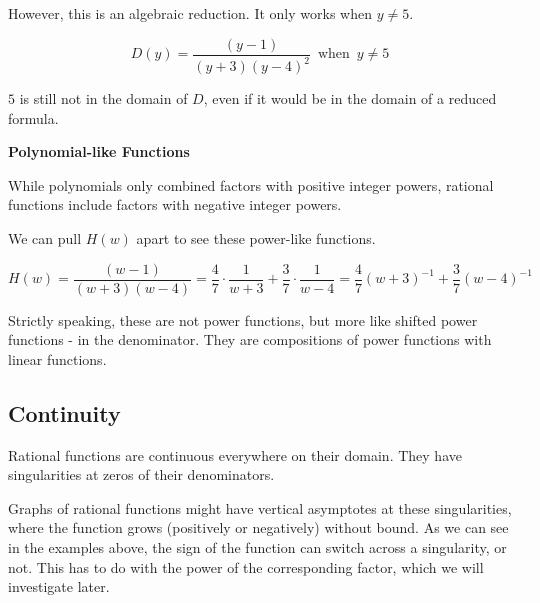 \documentclass{ximera}
\begin{document}
However, this is an algebraic reduction. It only works when $y \ne 5$.


\[
D(y) = \frac{(y-1)}{(y+3) (y-4)^2} \, \text{ when } \, y \ne 5
\]


$5$ is still not in the domain of $D$, even if it would be in the domain of a reduced formula.






\textbf{Polynomial-like Functions}


While polynomials only combined factors with positive integer powers, rational functions include factors with negative integer powers.


We can pull $H(w)$ apart to see these power-like functions.


\[    H(w) = \frac{(w-1)}{(w+3) (w-4)}  = \frac{4}{7} \cdot \frac{1}{w+3}  + \frac{3}{7} \cdot \frac{1}{w-4} =  \frac{4}{7} (w+3)^{-1}  + \frac{3}{7} (w-4)^{-1} \]


Strictly speaking, these are not power functions, but more like shifted power functions - in the denominator. They are compositions of power functions with linear functions.




















\subsection*{Continuity}


Rational functions are continuous everywhere on their domain.  They have singularities at zeros of their denominators.  

Graphs of rational functions might have vertical asymptotes at these singularities, where the function grows (positively or negatively) without bound.  As we can see in the examples above, the sign of the function can switch across a singularity, or not.  This has to do with the power of the corresponding factor, which we will investigate later.
\end{document}
